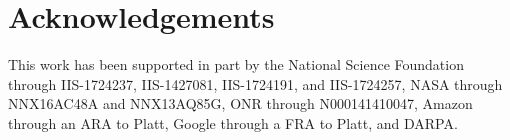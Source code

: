 \documentclass{article} %
\begin{document}

\section*{Acknowledgements}
This work has been supported in part by the National Science Foundation 
through IIS-1724237, IIS-1427081, IIS-1724191, and IIS-1724257, NASA through 
NNX16AC48A and NNX13AQ85G, ONR through N000141410047, Amazon through an 
ARA to Platt, Google through a FRA to Platt, and DARPA.
\end{document}
